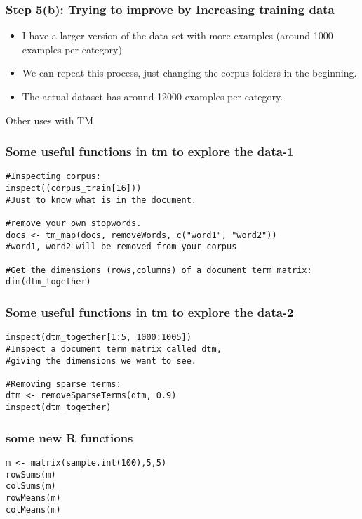 \documentclass{beamer}
\begin{document}
\begin{frame}
\frametitle{Step 5(b): Trying to improve by Increasing training data}
\begin{itemize}
\item I have a larger version of the  data set with more examples (around 1000 examples per category)
\item We can repeat this process, just changing the corpus folders in the beginning.
\item The actual dataset has around 12000 examples per category. 
\end{itemize}
\end{frame}

\begin{frame}
\center
\Large
Other uses with TM
\end{frame}

\begin{frame}[fragile]
\frametitle{Some useful functions in tm to explore the data-1}
\footnotesize
\begin{verbatim}
#Inspecting corpus:
inspect((corpus_train[16]))
#Just to know what is in the document. 

#remove your own stopwords.
docs <- tm_map(docs, removeWords, c("word1", "word2"))
#word1, word2 will be removed from your corpus

#Get the dimensions (rows,columns) of a document term matrix:
dim(dtm_together)
\end{verbatim}

\end{frame}

\begin{frame}[fragile]
\frametitle{Some useful functions in tm to explore the data-2}
\footnotesize
\begin{verbatim}
inspect(dtm_together[1:5, 1000:1005])
#Inspect a document term matrix called dtm, 
#giving the dimensions we want to see.

#Removing sparse terms:
dtm <- removeSparseTerms(dtm, 0.9)
inspect(dtm_together)
\end{verbatim}
\end{frame}

\begin{frame}[fragile]
\frametitle{some new R functions}
\begin{verbatim}
m <- matrix(sample.int(100),5,5)
rowSums(m)
colSums(m)
rowMeans(m)
colMeans(m)
\end{verbatim}
\end{frame}
\end{document}
